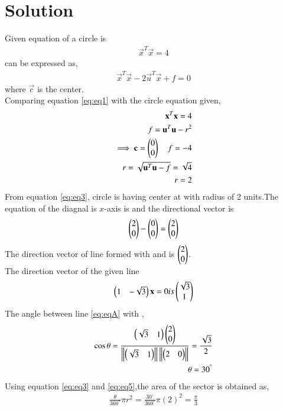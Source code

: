 \documentclass[journal,12pt,twocolumn]{IEEEtran}
\newcommand{\norm}[1]{\left\lVert#1\right\rVert}
\begin{document}
\section{Solution}
Given equation of a circle is 
    \begin{align}
        \vec{x}^{T} \vec{x} =4 \label{eq:A}
    \end{align}
can be expressed as,
\begin{align}
    \vec{x}^{T}\vec{x} - 2\vec{u}^{T}\vec{x} +f=0 \label{eq:eq1}
\end{align}
where $\vec{c}$ is the center.\\
Comparing equation \eqref{eq:eq1} with the circle equation given,
\begin{align}
    \mathbf{x}^{T}\mathbf{x} =4 \label{eq:eq2}\\
    \quad f = \mathbf{u}^T \mathbf{u}-r^2 \\
    \implies \mathbf{c} = \begin{pmatrix}0\\0\end{pmatrix} \quad f=-4\\
    r=\sqrt{\mathbf{u}^{T}\mathbf{u}-f} = \sqrt{4}\\
    r=2 \label{eq:eq3}
\end{align}
From equation \eqref{eq:eq3}, circle is having center at  with radius of 2 units.The equation of the diagnal is  $x$-axis is and the directional vector is 
\begin{align}
    \begin{pmatrix}2 \\ 0\end{pmatrix} - \begin{pmatrix}0 \\ 0\end{pmatrix} = \begin{pmatrix}2 \\ 0\end{pmatrix}  \label{eq:norm1}  
\end{align}
The direction vector of line formed with  and  is  $\begin{pmatrix}2\\0\end{pmatrix}$.\\
The direction vector of the given line 
\begin{align}
    \begin{pmatrix}1&-\sqrt{3}\end{pmatrix}\mathbf{x}=0 is \begin{pmatrix}\sqrt{3}\\1\end{pmatrix} \label{eq:eqA}
\end{align}
The angle between line \eqref{eq:eqA} with  ,
\begin{align}
    \cos\theta = \frac{\myvec{\sqrt{3}&1}\myvec{2\\0}}{\norm{\myvec{\sqrt{3}&1}}\norm{\myvec{2&0}}}=\frac{\sqrt{3}}{2} \label{eq:eq4}\\
    \theta = 30^{\degree}\label{eq:eq5}
\end{align}
Using equation \eqref{eq:eq3} and \eqref{eq:eq5},the area of the sector is obtained as,
\begin{align}
    \frac{\theta}{360^{\circ}}\pi r^2 = \frac{30^{\circ}}{360^{\circ}}\pi (2)^2=\frac{\pi}{3} \label{eq:eq6}
\end{align}
\end{document}
